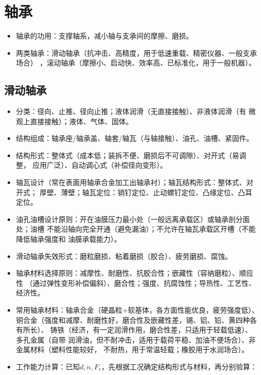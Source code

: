 \documentclass[12pt,a4paper]{article}
\newcommand{\tightlist}{\setlength{\parskip}{0pt}\setlength{\itemsep}{0pt}}
\newcommand{\hint}[1]{\textsf{（#1）}}
\begin{document}
\section{轴承}
\begin{itemize}\tightlist
    \item 轴承的功用：支撑轴系，减小轴与支承间的摩擦、磨损。
    \item 两类轴承：滑动轴承\hint{抗冲击、高精度，用于低速重载、精密仪器、一般支承场合}
    ，滚动轴承\hint{摩擦小、启动快、效率高、已标准化，用于一般机器}。
\end{itemize}

\subsection{滑动轴承}
\begin{itemize}\tightlist
    \item 分类：径向、止推、径向止推；液体润滑\hint{无直接接触}、非液体润滑\hint{有
    微观上直接接触}；液体、气体、固体。
    \item 结构组成：轴承座/轴承盖、轴套/轴瓦\hint{与轴接触}、油孔、油槽、紧固件。
    \item 结构形式：整体式\hint{成本低；装拆不便、磨损后不可调隙}、对开式\hint{易调整，
    应用广泛}、自动调心式\hint{补偿径向变形}。
    \item 轴瓦设计\hint{常在表面用轴承合金加工出轴承衬}；轴瓦结构形式：整体式、对开式；
    厚壁、薄壁；轴瓦定位：销钉定位、止动螺钉定位、凸缘定位、凸耳定位。
    \item 油孔油槽设计原则：开在油膜压力最小处\hint{一般远离承载区}或轴承剖分面处；油槽
    不能沿轴向完全开通\hint{避免漏油}；不允许在轴瓦承载区开槽\hint{不能降低轴承强度和
    油膜承载能力}。
    \item 滑动轴承失效形式：磨粒磨损、粘着磨损\hint{胶合}、疲劳磨损、腐蚀。
    \item 轴承材料选择原则：减摩性、耐磨性、抗胶合性；嵌藏性\hint{容纳磨粒}、顺应性
    \hint{通过弹性变形补偿偏斜}、磨合性；强度、抗腐蚀性；导热性、工艺性、经济性。
    \item 常用轴承材料：轴承合金\hint{硬晶粒+软基体，各方面性能优良，疲劳强度低}、
    铜合金\hint{强度和减摩、耐磨性好，磨合性及嵌藏性差，锡、铝、铅、黄四种各有所长}、
    铸铁\hint{经济，有一定润滑作用，磨合性差，只适用于轻载低速}、多孔金属\hint{自带
    润滑油，但不耐冲击，适用于载荷平稳、加油不便场合}、非金属材料\hint{塑料性能较好，
    不耐热，用于常温轻载；橡胶用于水润场合}。
    \item 工作能力计算：已知$d,n,F_r$，先根据工况确定结构形式与材料，再分别验算：

\end{itemize}
\end{document}
